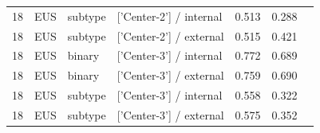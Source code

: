 \begin{longtable}{cL{1.1cm}L{1.5cm}L{5.6cm}ccc}
18 & EUS & subtype & ['Center-2'] / internal & 0.513 & 0.288 & \nl{} \\
18 & EUS & subtype & ['Center-2'] / external & 0.515 & 0.421 & \nl{} \\
18 & EUS & binary & ['Center-3'] / internal & 0.772 & 0.689 & \nl{} \\
18 & EUS & binary & ['Center-3'] / external & 0.759 & 0.690 & \nl{} \\
18 & EUS & subtype & ['Center-3'] / internal & 0.558 & 0.322 & \nl{} \\
18 & EUS & subtype & ['Center-3'] / external & 0.575 & 0.352 & \nl{} \\
\bottomrule
\end{longtable}
\endgroup